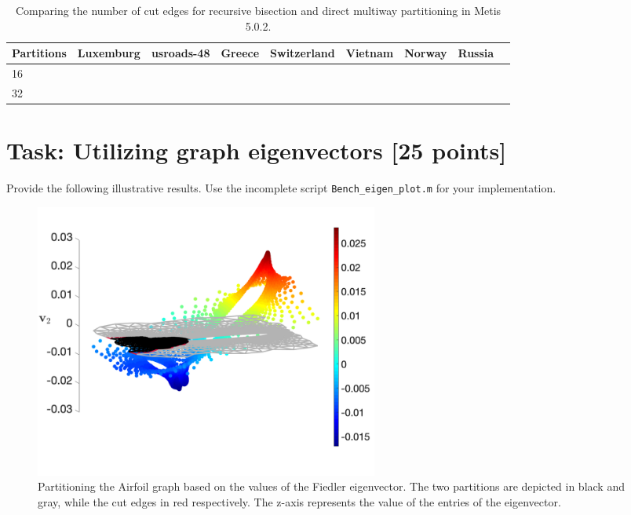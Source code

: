 \documentclass[unicode,11pt,a4paper,oneside,numbers=endperiod,openany]{scrartcl}
\begin{document}
\begin{table}[h]
\caption{Comparing the number of cut edges for recursive bisection and direct multiway partitioning in Metis 5.0.2.}
\centering
\begin{tabular}{l|r|r|r|r|r|r|r|r} \hline\hline 
Partitions       &   Luxemburg           & usroads-48 &  Greece &  Switzerland &  Vietnam  &  Norway &  Russia  \\ \hline
 16              &                       &            &         &              &           &         &          \\             
 32              &                       &            &         &              &           &         &          \\ \hline \hline
\end{tabular}              
\label{table:Compare_Metis}
\end{table}



\section{Task: Utilizing graph eigenvectors [25 points]}


Provide the following illustrative results. Use the incomplete script \texttt{Bench\_eigen\_plot.m} for your implementation.

\begin{figure}[!t]
	\begin{center}
		\includegraphics[width=0.55\textwidth]{images/fiedler_airfoil.png}
		\caption{Partitioning the Airfoil graph based on the values of the Fiedler eigenvector. The two partitions are depicted in black and gray, while the cut edges in red respectively. The z-axis represents the value of the entries of the eigenvector.}
		 \label{fig:fiedler_airfoil}
	\end{center}
\end{figure}
\end{document}
